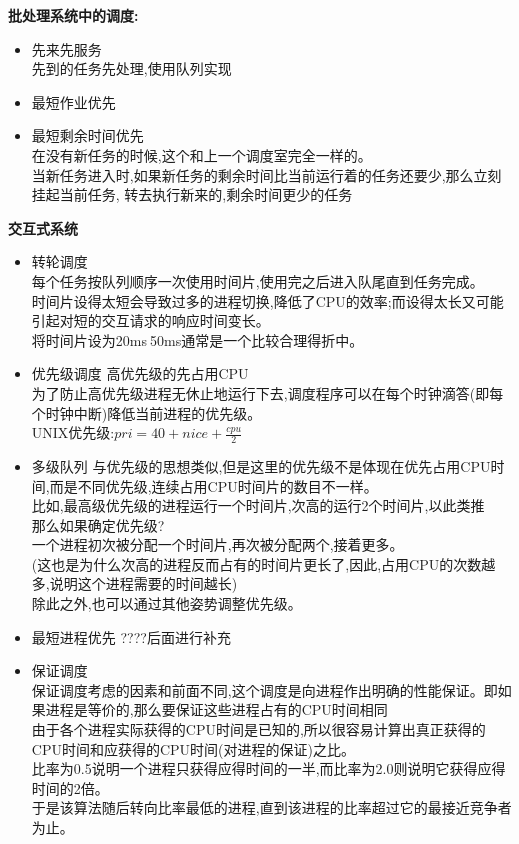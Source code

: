 \documentclass[UTF8,a4paper]{ctexart}
\newcommand{\spaceline}{\vspace{\baselineskip}}
\begin{document}
    \spaceline
    \textbf{批处理系统中的调度:}
    \begin{itemize}
      \item 先来先服务\\
      先到的任务先处理,使用队列实现
      \item 最短作业优先\\
      \item 最短剩余时间优先\\
      在没有新任务的时候,这个和上一个调度室完全一样的。\\
      当新任务进入时,如果新任务的剩余时间比当前运行着的任务还要少,那么立刻挂起当前任务,
      转去执行新来的,剩余时间更少的任务
    \end{itemize}

    \spaceline
    \textbf{交互式系统}
    \begin{itemize}
      \item 转轮调度\\
      每个任务按队列顺序一次使用时间片,使用完之后进入队尾直到任务完成。\\
      时间片设得太短会导致过多的进程切换,降低了CPU的效率;而设得太长又可能引起对短的交互请求的响应时间变长。\\
      将时间片设为20ms$~$50ms通常是一个比较合理得折中。

      \item 优先级调度
      高优先级的先占用CPU\\
      为了防止高优先级进程无休止地运行下去,调度程序可以在每个时钟滴答(即每个时钟中断)降低当前进程的优先级。\\
      UNIX优先级:$pri = 40 + nice + \frac{cpu}{2}$

      \item 多级队列
      与优先级的思想类似,但是这里的优先级不是体现在优先占用CPU时间,而是不同优先级,连续占用CPU时间片的数目不一样。\\
      比如,最高级优先级的进程运行一个时间片,次高的运行2个时间片,以此类推\\
      那么如果确定优先级?\\
      一个进程初次被分配一个时间片,再次被分配两个,接着更多。\\
      (这也是为什么次高的进程反而占有的时间片更长了,因此,占用CPU的次数越多,说明这个进程需要的时间越长)\\
      除此之外,也可以通过其他姿势调整优先级。

      \item 最短进程优先{\color{red} ????后面进行补充}

      \item 保证调度\\
      保证调度考虑的因素和前面不同,这个调度是向进程作出明确的性能保证。即如果进程是等价的,那么要保证这些进程占有的CPU时间相同\\
      由于各个进程实际获得的CPU时间是已知的,所以很容易计算出真正获得的CPU时间和应获得的CPU时间(对进程的保证)之比。\\
      比率为0.5说明一个进程只获得应得时间的一半,而比率为2.0则说明它获得应得时间的2倍。\\
      于是该算法随后转向比率最低的进程,直到该进程的比率超过它的最接近竞争者为止。


\end{itemize}
\end{document}
